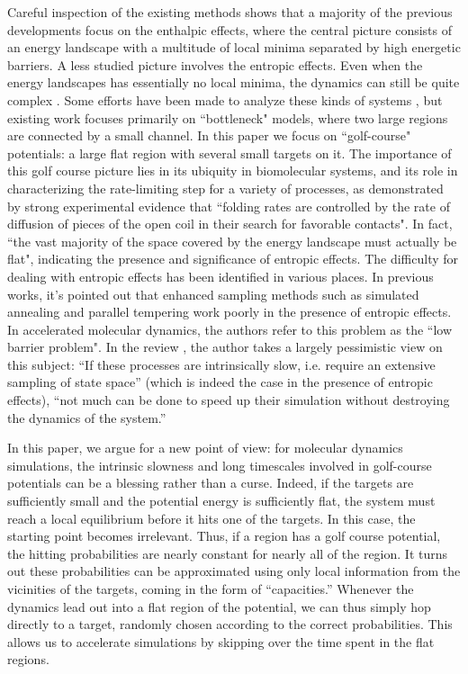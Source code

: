 \documentclass[english, aip, jcp, priprint, graphicx]{revtex4-1}
\theoremstyle{plain}
\theoremstyle{definition}
\theoremstyle{plain}
\begin{document}
Careful inspection of the existing methods shows that a majority of the previous developments focus on the enthalpic effects, where the central picture consists of an energy landscape with a multitude of local minima separated by high energetic barriers.  A less studied picture involves the entropic effects.  Even when the energy landscapes has essentially no local minima, the dynamics can still be quite complex \cite{Baum1986-we, Wille1987-tf}.  Some efforts have been made to analyze these kinds of systems \cite{Reguera2001-qa, Lwin2005-dm, Mondal2010-oh, Huang2009-kc, Sorensen2000-qm}, but existing work focuses primarily on ``bottleneck" models, where two large regions are connected by a small channel.  In this paper we focus on ``golf-course" potentials: a large flat region with several small targets on it. The importance of this golf course picture lies in its ubiquity in biomolecular systems, and its role in characterizing the rate-limiting step for a variety of processes, as demonstrated by strong experimental  evidence \cite{Teschner1987-qs, Jacob1999-bs, Goldberg1999-mv, Plaxco1998-iv} that ``folding rates are controlled by the rate of diffusion of pieces of the open coil in their search for favorable contacts"\cite{McLeish2005-dq}. In fact, ``the vast majority of the space covered by the energy landscape must actually be flat"\cite{McLeish2005-dq}, indicating the presence and significance of entropic effects.  The difficulty for dealing with entropic effects has been identified in various places. In previous works\cite{Baum1986-we, Wille1987-tf, Machta2009-gh}, it's pointed out that enhanced sampling methods such as simulated annealing and parallel tempering work poorly in the presence of entropic effects. In accelerated molecular dynamics\cite{Sorensen2000-qm}, the authors refer to this problem as the ``low barrier problem". In the review \cite{Christen2008-ge}, the author takes a largely pessimistic view on this subject: ``If these processes are intrinsically slow, i.e. require an extensive sampling of state space'' (which is indeed the case in the presence of entropic effects), ``not much can be done to speed up their simulation without destroying the dynamics of the system.''

In this paper, we argue for a new point of view: for molecular dynamics simulations, the intrinsic slowness and long timescales involved in golf-course potentials can be a blessing rather than a curse.  Indeed, if the targets are sufficiently small and the potential energy is sufficiently flat, the system must reach a local equilibrium before it hits one of the targets. In this case, the starting point becomes irrelevant. Thus, if a region has a golf course potential, the hitting probabilities are nearly constant for nearly all of the region. It turns out these probabilities can be approximated using only local information from the vicinities of the targets, coming in the form of “capacities.”   Whenever the dynamics lead out into a flat region of the potential, we can thus simply hop directly to a target, randomly chosen according to the correct probabilities.  This allows us to accelerate simulations by skipping over the time spent in the flat regions.
\end{document}
